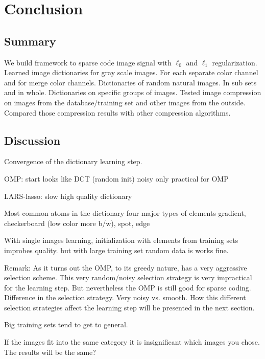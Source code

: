 \chapter{Conclusion}

\section{Summary} 
We build framework  to sparse code image signal with $\ell_0$ and
$\ell_1$ regularization. Learned image dictionaries for gray scale images. For
each separate color channel and for merge color channels. Dictionaries of
random natural images. In sub sets and in whole. Dictionaries on specific
groups of images. Tested image compression on images from the
database/training set and other images from the outside. 
Compared those compression results with other compression algorithms.



\section{Discussion}
Convergence of the dictionary learning step.

OMP:
  start looks like DCT (random init)
  noisy
  only practical for OMP

LARS-lasso:
  slow 
  high quality dictionary

  Most common atoms in the dictionary 
  four major types of elements
  gradient, checkerboard (low color more b/w), spot, edge



With single images learning, initialization with elements from training sets
improbes quality. but with large training set random data is works fine.


Remark:
As it turns out the OMP, to its greedy nature, has a very aggressive selection
scheme. This very random/noisy selection strategy is very impractical
for the \trainDL learning step. But nevertheless the OMP is still good for
sparse coding. 
Difference in the selection strategy.
Very noisy vs. smooth. 
How this different selection strategies affect the learning step will be
presented in the next section.

Big training sets tend to get to general.

If the images fit into the same category it is insignificant which images you
chose. The results will be the same?

